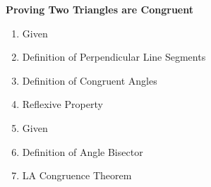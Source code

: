 \begin{center}
\textbf{Proving Two Triangles are Congruent}\\
\end{center}

\vspace*{1ex}

{\begin{enumerate}[label = \arabic*. ]
\item Given \redcheck 
\item Definition of Perpendicular Line Segments \redcheck 
\item Definition of Congruent Angles \redcheck 
\item Reflexive Property \redcheck 
\item Given \redcheck 
\item Definition of Angle Bisector \redcheck 
\item LA Congruence Theorem \redcheck 

\end{enumerate}}





     